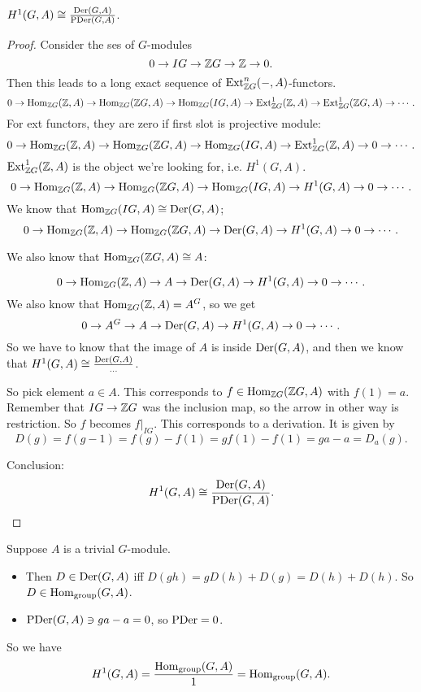\begin{theorem}[6.4.5]
    $H^{1}(G,A) \cong \frac{\operatorname{Der}(G, A)}{\operatorname{PDer}(G, A)}$.
\end{theorem}
\begin{proof}
    Consider the ses of $G$-modules
    \[
    0 \to  IG \to  \mathbb{Z} G \to  \mathbb{Z} \to  0
    .\] 
    Then this leads to a long exact sequence of $\operatorname{Ext} ^{n}_{\mathbb{Z} G} (-, A)$-functors.
    \[
        0 \to \operatorname{Hom}_{\mathbb{Z} G}(\mathbb{Z}, A) \to  \operatorname{Hom}_{\mathbb{Z} G}(\mathbb{Z} G, A) \to  \operatorname{Hom}_{\mathbb{Z} G}(IG, A) \to \operatorname{Ext} ^{1}_{\mathbb{Z} G}(\mathbb{Z}, A) \to  \operatorname{Ext} ^{1}_{\mathbb{Z} G}(\mathbb{Z} G,A) \to  \cdots
    .\] 
    For ext functors, they are zero if first slot is projective module:
    \[
        0 \to \operatorname{Hom}_{\mathbb{Z} G}(\mathbb{Z}, A) \to  \operatorname{Hom}_{\mathbb{Z} G}(\mathbb{Z} G, A) \to  \operatorname{Hom}_{\mathbb{Z} G}(IG, A) \to \operatorname{Ext} ^{1}_{\mathbb{Z} G}(\mathbb{Z}, A) \to  0 \to  \cdots
    .\] 
    $\operatorname{Ext}_{\mathbb{Z} G}^{1}(\mathbb{Z}, A)$ is the object we're looking for, i.e. $H^{1}(G, A)$.
    \[
        0 \to \operatorname{Hom}_{\mathbb{Z} G}(\mathbb{Z}, A) \to  \operatorname{Hom}_{\mathbb{Z} G}(\mathbb{Z} G, A) \to  \operatorname{Hom}_{\mathbb{Z} G}(IG, A) \to H^{1}(G, A) \to  0 \to  \cdots
    .\] 
    We know that $\operatorname{Hom}_{\mathbb{Z} G}(IG, A) \cong \operatorname{Der}(G, A)$;
    \[
        0 \to \operatorname{Hom}_{\mathbb{Z} G}(\mathbb{Z}, A) \to  \operatorname{Hom}_{\mathbb{Z} G}(\mathbb{Z} G, A) \to  \operatorname{Der}(G, A) \to H^{1}(G, A) \to  0 \to  \cdots
    .\] 

    We also know that $\operatorname{Hom}_{\mathbb{Z} G}(\mathbb{Z} G, A) \cong A$:

    \[
        0 \to \operatorname{Hom}_{\mathbb{Z} G}(\mathbb{Z}, A) \to  A \to  \operatorname{Der}(G, A) \to H^{1}(G, A) \to  0 \to  \cdots
    .\] 
    We also know that $\operatorname{Hom}_{\mathbb{Z} G}(\mathbb{Z}, A) = A^{G}$, so we get
    \[
        0 \to A^{G} \to  A \to  \operatorname{Der}(G, A) \to H^{1}(G, A) \to  0 \to  \cdots
    .\] 
    So we have to know that the image of $A$ is inside  $\operatorname{Der}(G, A)$, and then we know that  $H^{1}(G,A)\cong \frac{\operatorname{Der}(G, A)}{\ldots}$.

    So pick element $a \in  A$. This corresponds to $f \in \operatorname{Hom}_{\mathbb{Z} G}(\mathbb{Z} G, A)$ with  $f(1) = a$.
    Remember that $IG \to  \mathbb{Z} G$ was the inclusion map, so the arrow in other way is restriction.
    So $f$ becomes  $f|_{IG}$.
    This corresponds to a derivation.
    It is given by
    \[
        D(g) = f(g-1) = f(g) - f(1) = g f(1) - f(1) = ga - a = D_a(g)
    .\] 

    Conclusion:
    \[
        H^{1}(G, A) \cong \frac{\operatorname{Der}(G, A)}{\operatorname{PDer}(G, A)}
    .\] 
\end{proof}


\begin{eg}
    Suppose $A$ is a trivial  $G$-module.
    \begin{itemize}
        \item Then $D \in \operatorname{Der}(G, A)$ iff $D(gh) = gD(h) + D(g) = D(h) + D(h)$.
            So  $D \in \operatorname{Hom}_{\text{group}}(G, A)$.
        \item $\operatorname{PDer}(G, A) \ni ga -a = 0$, so  $\operatorname{PDer} = 0$.
    \end{itemize}
    So we have
    \[
        H^{1}(G, A) = \frac{\operatorname{Hom}_\text{group}(G, A) }{1} = \operatorname{Hom}_{\text{group}}(G, A)
    .\] 
\end{eg}

